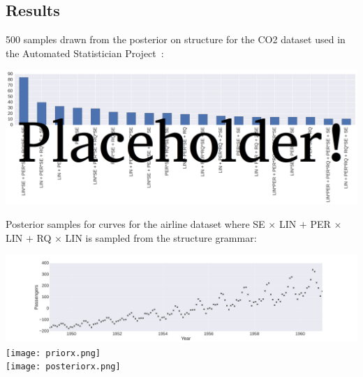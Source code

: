 \documentclass[a0,portrait]{a0poster}
\begin{document}
\begin{multicols}{3}
 \subsection*{Results}
 500 samples drawn from the posterior on structure for the CO2 dataset used in the Automated Statistician Project~\cite{duvenaud2013structure}:
 \begin{center}\vspace{1cm}
\includegraphics[width=0.7\linewidth]{structureCo2b.png}
\end{center}\vspace{1cm}
Posterior samples for curves for the airline dataset where SE $\times$ LIN $+$ PER $\times$ LIN $+$  RQ $\times$ LIN is sampled from the structure grammar:
 \begin{center}\vspace{1cm}
\includegraphics[width=\linewidth]{rawx.png}\\
\texttt{[image: priorx.png]}\\
\texttt{[image: posteriorx.png]}
\end{center}



\end{multicols}
\end{document}

